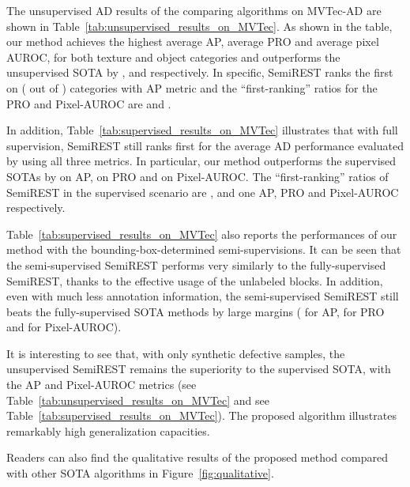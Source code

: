 The unsupervised AD results of the comparing algorithms on MVTec-AD \citep{bergmann2019mvtec} are shown in Table~\ref{tab:unsupervised_results_on_MVTec}. As shown in the table, our method
achieves the highest average AP, average PRO and average pixel AUROC, for both texture and
object categories and outperforms the unsupervised SOTA by ,
 and  respectively. In specific, Semi\-REST ranks the first on  ( out of ) categories with AP metric and the ``first-ranking'' ratios for the PRO and Pixel-AUROC are  and . 

In addition, Table~\ref{tab:supervised_results_on_MVTec} illustrates that with full supervision, SemiREST
still ranks first for the average AD performance evaluated by using all three metrics. In particular, our method outperforms the supervised SOTAs by  on AP,  on PRO and  on Pixel-AUROC. The ``first-ranking'' ratios of SemiREST in the supervised scenario are ,  and  one AP, PRO and Pixel-AUROC respectively. 

Table~\ref{tab:supervised_results_on_MVTec} also reports the performances of our method with the bounding-box-determined semi-supervisions. It can be seen that the semi-supervised SemiREST performs very similarly to the fully-supervised Semi\-REST, thanks to the effective usage of the unlabeled blocks. In addition, even with much less annotation information, the semi-supervised SemiREST still beats the fully-supervised SOTA methods by large margins ( for AP,  for PRO and  for Pixel-AUROC). 

It is interesting to see that, with only synthetic defective samples, the unsupervised SemiREST remains the superiority to the supervised SOTA, with the AP and Pixel-AUROC metrics (see Table~\ref{tab:unsupervised_results_on_MVTec} and see Table~\ref{tab:supervised_results_on_MVTec}). The proposed  algorithm illustrates remarkably high generalization capacities.  

Readers can also find the qualitative results of the proposed method compared with other SOTA algorithms in Figure~\ref{fig:qualitative}.

